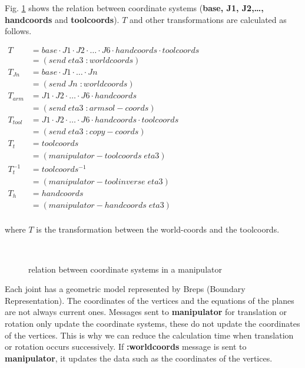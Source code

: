 Fig. \ref{JointCoords} shows the relation between coordinate systems 
({\bf base, J1, J2,\ldots , handcoords} and {\bf toolcoords}). $T$ and other 
transformations are calculated as follows.


$
\begin{array}{ll}
T & = base \cdot J1 \cdot J2 \cdot \ldots 
\cdot J6 \cdot handcoords \cdot toolcoords \\ 
 & = (send \; eta3 \; :worldcoords) \\ 
T_{Jn} & = base \cdot J1\cdot \ldots \cdot Jn \\
 & = (send \; Jn \; :worldcoords) \\
T_{arm} & = J1 \cdot J2 \cdot \ldots \cdot J6 \cdot handcoords \\ 
 & = (send \; eta3 \; :armsol-coords) \\ 
T_{tool} & = J1 \cdot J2 \cdot  \ldots \cdot J6 \cdot handcoords \cdot toolcoords \\ 
 & = (send \; eta3 \; :copy-coords) \\
T_{t} & = toolcoords \\ 
 & = (manipulator-toolcoords \; eta3)\\
T_{t}^{-1} & = toolcoords^{-1} \\ 
 & = (manipulator-toolinverse \; eta3) \\
T_{h} & = handcoords \\ 
 & = (manipulator-handcoords \; eta3)\\
\end{array}$

where $T$ is the transformation between the world-coords and the toolcoords.

\begin{figure}
\begin{center}
\mbox{
\epsfysize=10cm
}
\end{center}
\caption{\label{JointCoords}
relation between coordinate systems in a manipulator}

\end{figure}

Each joint has a geometric model represented by Breps (Boundary Representation).
The coordinates of the vertices and the equations of the planes are not always 
current ones. Messages sent to {\bf manipulator} for translation or rotation only
update the coordinate systems, these do not update the coordinates of the 
vertices. This is why we can reduce the calculation time when translation or 
rotation occurs successively. If {\bf :worldcoords} message is sent to 
{\bf manipulator}, it updates the data such as the coordinates of the vertices.

